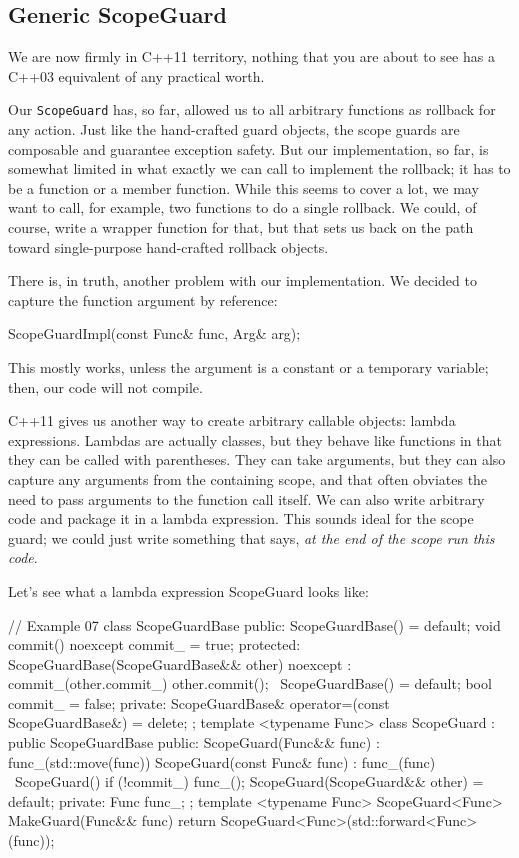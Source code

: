 \subsection{Generic ScopeGuard}

We are now firmly in C++11 territory, nothing that you are about to see has a C++03 equivalent of any practical worth.

Our \texttt{ScopeGuard} has, so far, allowed us to all arbitrary functions as rollback for any action. Just like the hand-crafted guard objects, the scope guards are composable and guarantee exception safety. But our implementation, so far, is somewhat limited in what exactly we can call to implement the rollback; it has to be a function or a member function. While this seems to cover a lot, we may want to call, for example, two functions to do a single rollback. We could, of course, write a wrapper function for that, but that sets us back on the path toward single-purpose hand-crafted rollback objects.

There is, in truth, another problem with our implementation. We decided to capture the function argument by reference:

\begin{code}
ScopeGuardImpl(const Func& func, Arg& arg);
\end{code}

This mostly works, unless the argument is a constant or a temporary variable; then, our code will not compile.

C++11 gives us another way to create arbitrary callable objects: lambda expressions. Lambdas are actually classes, but they behave like functions in that they can be called with parentheses. They can take arguments, but they can also capture any arguments from the containing scope, and that often obviates the need to pass arguments to the function call itself. We can also write arbitrary code and package it in a lambda expression. This sounds ideal for the scope guard; we could just write something that says, \emph{at the end of the scope run} \emph{this code}.

Let's see what a lambda expression ScopeGuard looks like:

\begin{code}
// Example 07
class ScopeGuardBase {
  public:
  ScopeGuardBase() = default;
  void commit() noexcept { commit_ = true; }
  protected:
  ScopeGuardBase(ScopeGuardBase&& other) noexcept :
    commit_(other.commit_) { other.commit(); }
  ~ScopeGuardBase() = default;
  bool commit_ = false;
  private:
  ScopeGuardBase& operator=(const ScopeGuardBase&)
    = delete;
};
template <typename Func>
class ScopeGuard : public ScopeGuardBase {
  public:
  ScopeGuard(Func&& func) : func_(std::move(func)) {}
  ScopeGuard(const Func& func) : func_(func) {}
  ~ScopeGuard() { if (!commit_) func_(); }
  ScopeGuard(ScopeGuard&& other) = default;
  private:
  Func func_;
};
template <typename Func>
ScopeGuard<Func> MakeGuard(Func&& func) {
  return ScopeGuard<Func>(std::forward<Func>(func));
}
\end{code}

